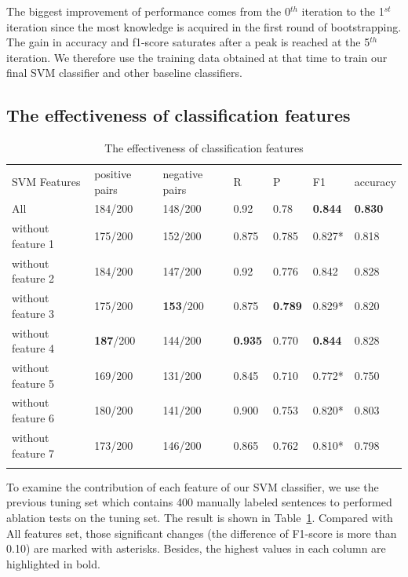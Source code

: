 The biggest improvement of performance comes from the 0$^{th}$ iteration to the 
1$^{st}$ iteration since the most knowledge is acquired in the first round of 
bootstrapping. The gain in accuracy and f1-score saturates after a peak is reached at 
the 5$^{th}$ iteration. We therefore use the training data obtained at that time to 
train our final SVM classifier and other baseline classifiers.

\subsection{The effectiveness of classification features}
\label{subsec:3.2}

\begin{table}
	\centering
	\caption{The effectiveness of classification features}
	\label{tab:3}       %
	\begin{tabular}{m{2.5cm}m{1.4cm}m{1.4cm}m{0.8cm}m{0.8cm}m{0.8cm}m{1cm}}
		\hline\noalign{\smallskip}
		SVM Features & positive pairs & negative pairs & R & P & F1 & accuracy \\
		\noalign{\smallskip}\hline\noalign{\smallskip}
		All & 184/200 & 148/200 & 0.92 & 0.78 & \textbf{0.844} & \textbf{0.830} \\
		without feature 1 & 175/200 & 152/200 & 0.875 & 0.785 & 0.827* & 0.818 \\
		without feature 2 & 184/200 & 147/200 & 0.92 & 0.776 & 0.842 & 0.828 \\
		without feature 3 & 175/200 & \textbf{153}/200 & 0.875 & \textbf{0.789} & 0.829* & 0.820 \\
		without feature 4 & \textbf{187}/200 & 144/200 & \textbf{0.935} & 0.770 & \textbf{0.844} & 0.828 \\
		without feature 5 & 169/200 & 131/200 & 0.845 & 0.710 & 0.772* & 0.750 \\
		without feature 6 & 180/200 & 141/200 & 0.900 & 0.753 & 0.820* & 0.803 \\
		without feature 7 & 173/200 & 146/200 & 0.865 & 0.762 & 0.810* & 0.798 \\
		\noalign{\smallskip}\hline
	\end{tabular}
\end{table}

To examine the contribution of each feature of our SVM classifier, we use the previous tuning set which contains 400 manually labeled sentences to performed ablation tests on the tuning set. The result is shown in Table~\ref{tab:3}. Compared with All features set, those significant changes (the difference of F1-score is more than 0.10) are marked with asterisks. Besides, the highest values in each column are highlighted in bold.

